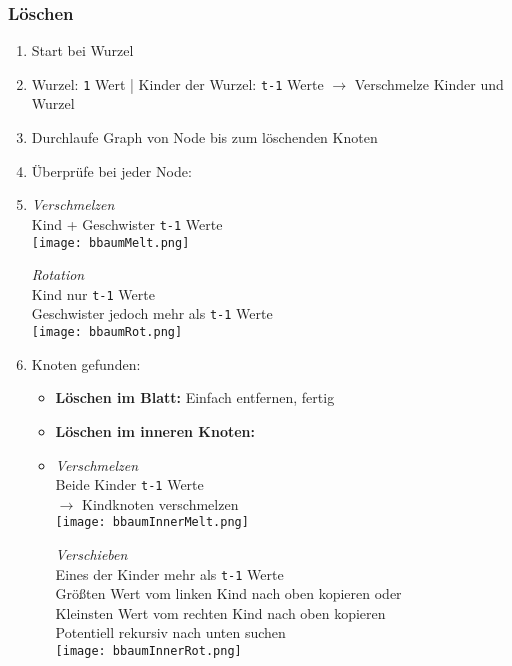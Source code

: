 \subsubsection*{Löschen}
\begin{enumerate}
    \item Start bei Wurzel
    \item[] Wurzel: \texttt{1} Wert | Kinder der Wurzel: \texttt{t-1} Werte $\rightarrow$ Verschmelze Kinder und Wurzel
    \item Durchlaufe Graph von Node bis zum löschenden Knoten
    \item Überprüfe bei jeder Node:
    \item[]
        \begin{minipage}{0.45\textwidth}
            \textit{Verschmelzen} \\
            Kind + Geschwister \texttt{t-1} Werte \\
            \texttt{[image: bbaumMelt.png]}
        \end{minipage} 
        \begin{minipage}{0.45\textwidth}
        \textit{Rotation} \\
        Kind nur \texttt{t-1} Werte \\
        Geschwister jedoch mehr als \texttt{t-1} Werte \\
        \texttt{[image: bbaumRot.png]}
        \end{minipage}
    \item Knoten gefunden:
        \begin{itemize}
            \item \textbf{Löschen im Blatt:} Einfach entfernen, fertig
            \item \textbf{Löschen im inneren Knoten:}
            \item[]
                \begin{minipage}{0.4\textwidth}
                    \textit{Verschmelzen} \\
                    Beide Kinder \texttt{t-1} Werte \\
                    $\rightarrow$ Kindknoten verschmelzen \\
                    \texttt{[image: bbaumInnerMelt.png]}
                \end{minipage} 
                \begin{minipage}{0.5\textwidth}
                \textit{Verschieben} \\
                Eines der Kinder mehr als \texttt{t-1} Werte \\
                Größten Wert vom linken Kind nach oben kopieren oder \\
                Kleinsten Wert vom rechten Kind nach oben kopieren\\
                Potentiell rekursiv nach unten suchen \\
                \texttt{[image: bbaumInnerRot.png]}
                \end{minipage}
                \end{itemize}
\end{enumerate}

